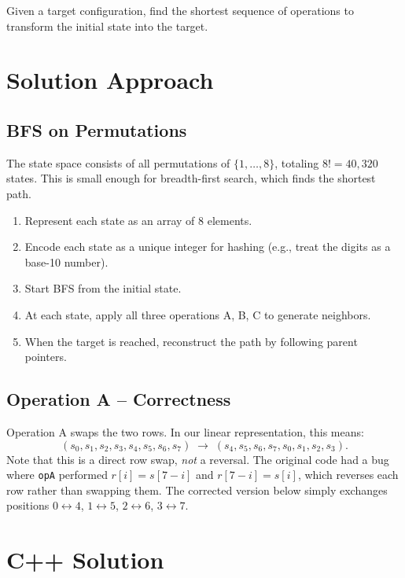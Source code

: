 \documentclass[11pt,a4paper]{article}
\begin{document}
Given a target configuration, find the shortest sequence of operations to transform
the initial state into the target.

\section{Solution Approach}

\subsection{BFS on Permutations}

The state space consists of all permutations of $\{1,\ldots,8\}$, totaling $8! = 40{,}320$
states. This is small enough for breadth-first search, which finds the shortest path.

\begin{enumerate}
  \item Represent each state as an array of 8 elements.
  \item Encode each state as a unique integer for hashing (e.g., treat the digits as
        a base-10 number).
  \item Start BFS from the initial state.
  \item At each state, apply all three operations A, B, C to generate neighbors.
  \item When the target is reached, reconstruct the path by following parent pointers.
\end{enumerate}

\subsection{Operation A -- Correctness}

Operation A swaps the two rows. In our linear representation, this means:
\[
  (s_0, s_1, s_2, s_3, s_4, s_5, s_6, s_7) \;\to\; (s_4, s_5, s_6, s_7, s_0, s_1, s_2, s_3).
\]
Note that this is a direct row swap, \emph{not} a reversal. The original code had a bug
where \texttt{opA} performed $r[i] = s[7-i]$ and $r[7-i] = s[i]$, which reverses each row
rather than swapping them. The corrected version below simply exchanges positions
$0 \leftrightarrow 4$, $1 \leftrightarrow 5$, $2 \leftrightarrow 6$, $3 \leftrightarrow 7$.

\section{C++ Solution}
\end{document}
